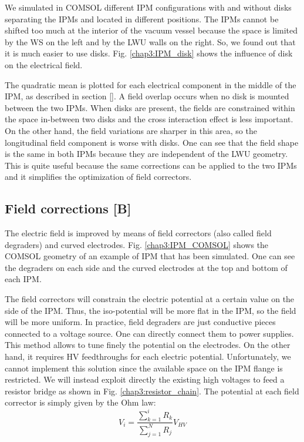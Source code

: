\begin{refsection}
  We simulated in COMSOL different IPM configurations with and without disks separating the IPMs and located in different positions. The IPMs cannot be shifted too much at the interior of the vacuum vessel because the space is limited by the WS on the left and by the LWU walls on the right. So, we found out that it is much easier to use disks. Fig. \ref{chap3:IPM_disk} shows the influence of disk on the electrical field.

  

  The quadratic mean is plotted for each electrical component in the middle of the IPM, as described in section \ref{}. A field overlap occurs when no disk is mounted between the two IPMs. When disks are present, the fields are constrained within the space in-between two disks and the cross interaction effect is less important. On the other hand, the field variations are sharper in this area, so the longitudinal field component is worse with disks. One can see that the field shape is the same in both IPMs because they are independent of the LWU geometry. This is quite useful because the same corrections can be applied to the two IPMs and it simplifies the optimization of field correctors.

  \subsection{Field corrections [B]}
  \label{chap3:field_corrections}
  
  The electric field is improved by means of field correctors (also called field degraders) and curved electrodes. Fig. \ref{chap3:IPM_COMSOL} shows the COMSOL geometry of an example of IPM that has been simulated. One can see the degraders on each side and the curved electrodes at the top and bottom of each IPM.

  The field correctors will constrain the electric potential at a certain value on the side of the IPM. Thus, the iso-potential will be more flat in the IPM, so the field will be more uniform. In practice, field degraders are just conductive pieces connected to a voltage source. One can directly connect them to power supplies. This method allows to tune finely the potential on the electrodes.
  On the other hand, it requires HV feedthroughs for each electric potential. Unfortunately, we cannot implement this solution since the available space on the IPM flange is restricted. We will instead exploit directly the existing high voltages to feed a resistor bridge as shown in Fig. \ref{chap3:resistor_chain}. The potential at each field corrector is simply given by the Ohm law:
  \begin{equation}
    V_{i} = \frac{\sum_{k = 1}^{i} R_{k}}{\sum_{j = 1}^{N} R_{j}}V_{HV} \label{chap3:PontDiviseur}
  \end{equation}


\end{refsection}
